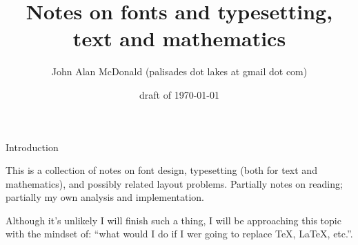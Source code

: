 \documentclass[11pt]{PalisadesLakesBook}
\title{Notes on fonts and typesetting, text and mathematics}
\author{John Alan McDonald 
(palisades dot lakes at gmail dot com)}
\date{draft of \today}
\begin{document}
\maketitle
{}
\def\sharedFolder{../../shared/}

\begin{plSection}{Introduction}

This is a collection of notes on font design,
typesetting (both for text and mathematics),
and possibly related layout problems. 
Partially notes on reading; 
partially my own analysis and implementation.

Although it's unlikely I will finish such a thing,
I will be approaching this topic with the mindset of:
``what would I do if I wer going to replace \TeX, \LaTeX, etc.''.


\end{plSection}%
\end{document}
